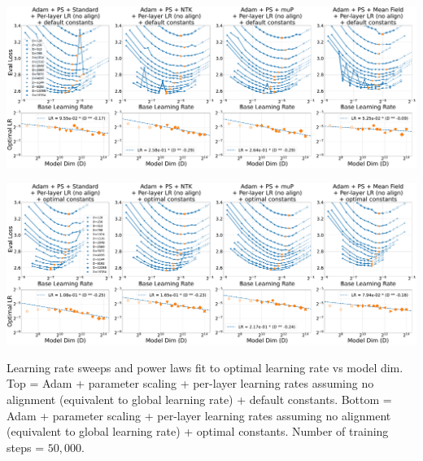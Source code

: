 \thispagestyle{plain}
\begin{SidewaysFigure}
\includegraphics[width=0.98\linewidth]{icml2024/figures/lr_sweeps/appendix/adam_ps/adam_ps+50k_steps.pdf}

\figvspace

\includegraphics[width=0.98\linewidth]{icml2024/figures/lr_sweeps/appendix/adam_ps/adam_ps+50k_steps_optimal_constants_only.pdf}
\caption{Learning rate sweeps and power laws fit to optimal learning rate vs model dim. Top = Adam + parameter scaling + per-layer learning rates assuming no alignment (equivalent to global learning rate) + default constants. Bottom = Adam + parameter scaling + per-layer learning rates assuming no alignment (equivalent to global learning rate) + optimal constants. Number of training steps = $50{,}000$.}
\label{fig:lr_sweep_adam_ps_no_align}
\end{SidewaysFigure}
\clearpage

